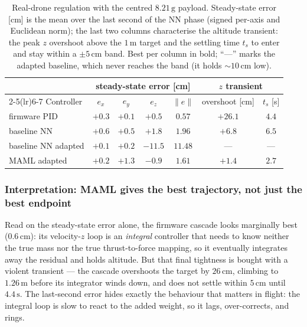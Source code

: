 \documentclass[11pt,a4paper]{article}
\theoremstyle{remark}
\numberwithin{equation}{section}
\begin{document}
\begin{table}[H]
    \centering
    \caption{Real-drone regulation with the centred $8.21\,\mathrm{g}$ payload.
    Steady-state error [cm] is the mean over the last second of the NN phase
    (signed per-axis and Euclidean norm); the last two columns characterise the
    altitude transient: the peak $z$ overshoot above the $1\,\mathrm{m}$ target and
    the settling time $t_s$ to enter and stay within a $\pm5\,\mathrm{cm}$ band.
    Best per column in bold; ``---'' marks the adapted baseline, which never
    reaches the band (it holds $\sim\!10\,\mathrm{cm}$ low).}
    \label{tab:maml_real}
    \small
    \begin{tabular}{l cccc cc}
        \toprule
        & \multicolumn{4}{c}{steady-state error [cm]} & \multicolumn{2}{c}{$z$ transient} \\
        \cmidrule(lr){2-5}\cmidrule(lr){6-7}
        Controller & $e_x$ & $e_y$ & $e_z$ & $\lVert e\rVert$ & overshoot [cm] & $t_s$ [s] \\
        \midrule
        firmware PID        & $+0.3$ & $+0.1$ & $+0.5$  & $\mathbf{0.57}$ & $+26.1$ & $4.4$ \\
        baseline NN         & $+0.6$ & $+0.5$ & $+1.8$  & $1.96$ & $+6.8$ & $6.5$ \\
        baseline NN adapted & $+0.1$ & $+0.2$ & $-11.5$ & $11.48$ & --- & --- \\
        MAML adapted        & $+0.2$ & $+1.3$ & $-0.9$  & $1.61$ & $\mathbf{+1.4}$ & $\mathbf{2.7}$ \\
        \bottomrule
    \end{tabular}
\end{table}

\subsubsection*{Interpretation: MAML gives the best trajectory, not just the best endpoint}

Read on the steady-state error alone, the firmware cascade looks marginally best
($0.6\,\mathrm{cm}$): its velocity-$z$ loop is an \emph{integral} controller that
needs to know neither the true mass nor the true thrust-to-force mapping, so it
eventually integrates away the residual and holds altitude. But that final
tightness is bought with a violent transient --- the cascade overshoots the target
by $26\,\mathrm{cm}$, climbing to $1.26\,\mathrm{m}$ before its integrator winds
down, and does not settle within $5\,\mathrm{cm}$ until $4.4\,\mathrm{s}$. The
last-second error hides exactly the behaviour that matters in flight: the integral
loop is slow to react to the added weight, so it lags, over-corrects, and rings.
\end{document}
